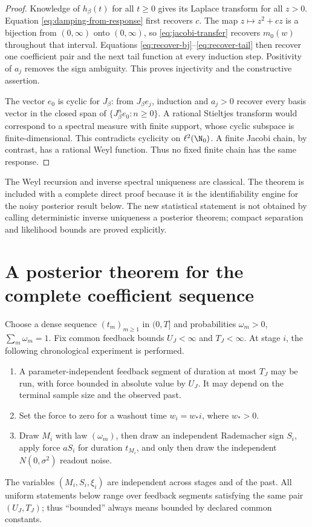 \begin{proof}
Knowledge of \(h_\beta(t)\) for all \(t\ge0\) gives its Laplace transform for
all \(z>0\).  Equation \eqref{eq:damping-from-response} first recovers \(c\).
The map \(z\mapsto z^2+cz\) is a bijection from \((0,\infty)\) onto
\((0,\infty)\), so \eqref{eq:jacobi-transfer} recovers \(m_0(w)\) throughout
that interval.  Equations \eqref{eq:recover-bj}--\eqref{eq:recover-tail} then
recover one coefficient pair and the next tail function at every induction
step.  Positivity of \(a_j\) removes the sign ambiguity.  This proves
injectivity and the constructive assertion.

The vector \(e_0\) is cyclic for \(J_\beta\): from
\(J_\beta e_j\), induction and \(a_j>0\) recover every basis vector in the
closed span of \(\{J_\beta^ne_0:n\ge0\}\).  A rational Stieltjes transform
would correspond to a spectral measure with finite support, whose cyclic
subspace is finite-dimensional.  This contradicts cyclicity on
\(\ell^2(\N_0)\).  A finite Jacobi chain, by contrast, has a rational Weyl
function.  Thus no fixed finite chain has the same response.
\end{proof}

\begin{remark}
The Weyl recursion and inverse spectral uniqueness are classical.  The theorem
is included with a complete direct proof because it is the identifiability
engine for the noisy posterior result below.  The new statistical statement
is not obtained by calling deterministic inverse uniqueness a posterior
theorem; compact separation and likelihood bounds are proved explicitly.
\end{remark}

\section{A posterior theorem for the complete coefficient sequence}
\label{sec:jacobi-statistics}

Choose a dense sequence \((t_m)_{m\ge1}\) in \((0,T]\) and probabilities
\(\omega_m>0\), \(\sum_m\omega_m=1\).  Fix common feedback bounds
\(U_J<\infty\) and \(T_J<\infty\).  At stage \(i\), the following
chronological experiment is performed.
\begin{enumerate}
\item A parameter-independent feedback segment of duration at most \(T_J\)
may be run, with force bounded in absolute value by \(U_J\).  It may depend on
the terminal sample size and the observed past.
\item Set the force to zero for a washout time \(w_i=w_*i\), where \(w_*>0\).
\item Draw \(M_i\) with law \((\omega_m)\), then draw an independent
Rademacher sign \(S_i\), apply force \(aS_i\) for duration \(t_{M_i}\), and
only then draw the independent \(N(0,\sigma^2)\) readout noise.
\end{enumerate}
The variables \((M_i,S_i,\xi_i)\) are independent across stages and of the
past.  All uniform statements below range over feedback segments satisfying
the same pair \((U_J,T_J)\); thus ``bounded'' always means bounded by declared
common constants.

